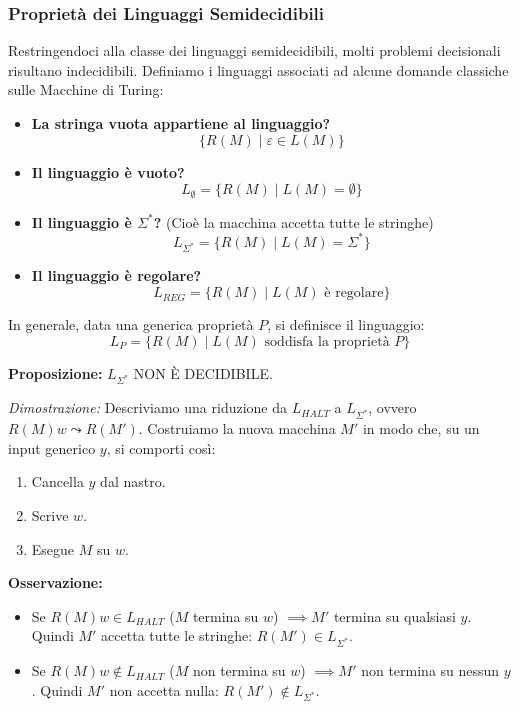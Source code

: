 \vspace{0.8cm}
\subsubsection{Proprietà dei Linguaggi Semidecidibili}
Restringendoci alla classe dei linguaggi semidecidibili, molti problemi decisionali risultano indecidibili. Definiamo i linguaggi associati ad alcune domande classiche sulle Macchine di Turing:

\begin{itemize}
    \item \textbf{La stringa vuota appartiene al linguaggio?}
    $$ \{R(M) \mid \varepsilon \in L(M)\} $$
    
    \item \textbf{Il linguaggio è vuoto?}
    $$ L_{\emptyset} = \{R(M) \mid L(M) = \emptyset\} $$
    
    \item \textbf{Il linguaggio è $\Sigma^*$?} (Cioè la macchina accetta tutte le stringhe)
    $$ L_{\Sigma^*} = \{R(M) \mid L(M) = \Sigma^*\} $$
    
    \item \textbf{Il linguaggio è regolare?}
    $$ L_{REG} = \{R(M) \mid L(M) \text{ è regolare}\} $$
\end{itemize}

In generale, data una generica proprietà $P$, si definisce il linguaggio:
$$ L_P = \{R(M) \mid L(M) \text{ soddisfa la proprietà } P\} $$














\vspace{0.4cm}
\textbf{Proposizione:} $L_{\Sigma^*}$ NON È DECIDIBILE.

\textit{Dimostrazione:} Descriviamo una riduzione da $L_{HALT}$ a $L_{\Sigma^*}$, ovvero $R(M)w \leadsto R(M')$.
Costruiamo la nuova macchina $M'$ in modo che, su un input generico $y$, si comporti così:
\begin{enumerate}
    \item Cancella $y$ dal nastro.
    \item Scrive $w$.
    \item Esegue $M$ su $w$.
\end{enumerate}

\textbf{Osservazione:}
\begin{itemize}
    \item Se $R(M)w \in L_{HALT}$ ($M$ termina su $w$) $\implies M'$ termina su qualsiasi $y$. Quindi $M'$ accetta tutte le stringhe: $R(M') \in L_{\Sigma^*}$.
    \item Se $R(M)w \notin L_{HALT}$ ($M$ non termina su $w$) $\implies M'$ non termina su nessun $y$. Quindi $M'$ non accetta nulla: $R(M') \notin L_{\Sigma^*}$.
\end{itemize}

